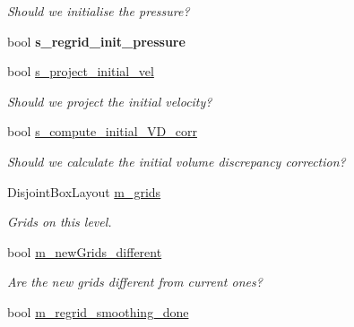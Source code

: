 \begin{DoxyCompactItemize}
\begin{DoxyCompactList}\small\item\em Should we initialise the pressure? \end{DoxyCompactList}\item 
\hypertarget{class_a_m_r_level_mushy_layer_ad63ca84ccd8a3ed30ca6f9034cfb325f}{bool {\bfseries s\-\_\-regrid\-\_\-init\-\_\-pressure}}\label{class_a_m_r_level_mushy_layer_ad63ca84ccd8a3ed30ca6f9034cfb325f}

\item 
\hypertarget{class_a_m_r_level_mushy_layer_a9932c8c2aee096420d2b8dedb77b30e4}{bool \hyperlink{class_a_m_r_level_mushy_layer_a9932c8c2aee096420d2b8dedb77b30e4}{s\-\_\-project\-\_\-initial\-\_\-vel}}\label{class_a_m_r_level_mushy_layer_a9932c8c2aee096420d2b8dedb77b30e4}

\begin{DoxyCompactList}\small\item\em Should we project the initial velocity? \end{DoxyCompactList}\item 
\hypertarget{class_a_m_r_level_mushy_layer_a338b8e8a3fde134807d7e5b2ff47a64f}{bool \hyperlink{class_a_m_r_level_mushy_layer_a338b8e8a3fde134807d7e5b2ff47a64f}{s\-\_\-compute\-\_\-initial\-\_\-\-V\-D\-\_\-corr}}\label{class_a_m_r_level_mushy_layer_a338b8e8a3fde134807d7e5b2ff47a64f}

\begin{DoxyCompactList}\small\item\em Should we calculate the initial volume discrepancy correction? \end{DoxyCompactList}\item 
\hypertarget{class_a_m_r_level_mushy_layer_a1099c89fd5bc80bf46eea1823a0d3ae3}{Disjoint\-Box\-Layout \hyperlink{class_a_m_r_level_mushy_layer_a1099c89fd5bc80bf46eea1823a0d3ae3}{m\-\_\-grids}}\label{class_a_m_r_level_mushy_layer_a1099c89fd5bc80bf46eea1823a0d3ae3}

\begin{DoxyCompactList}\small\item\em Grids on this level. \end{DoxyCompactList}\item 
\hypertarget{class_a_m_r_level_mushy_layer_a8eec8d2d864c28268839fd35d1788cb4}{bool \hyperlink{class_a_m_r_level_mushy_layer_a8eec8d2d864c28268839fd35d1788cb4}{m\-\_\-new\-Grids\-\_\-different}}\label{class_a_m_r_level_mushy_layer_a8eec8d2d864c28268839fd35d1788cb4}

\begin{DoxyCompactList}\small\item\em Are the new grids different from current ones? \end{DoxyCompactList}\item 
\hypertarget{class_a_m_r_level_mushy_layer_a4c79c5e47b397340a7e682026e1a2081}{bool \hyperlink{class_a_m_r_level_mushy_layer_a4c79c5e47b397340a7e682026e1a2081}{m\-\_\-regrid\-\_\-smoothing\-\_\-done}}\label{class_a_m_r_level_mushy_layer_a4c79c5e47b397340a7e682026e1a2081}


\end{DoxyCompactItemize}
